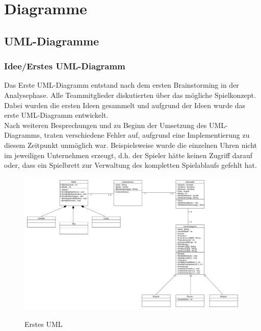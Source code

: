 \clearpage
\chapter{Diagramme}
\section{UML-Diagramme}
\subsection{Idee/Erstes UML-Diagramm}
Das Erste UML-Diagramm entstand nach dem ersten Brainstorming in der Analysephase. Alle Teammitglieder diskutierten über das mögliche Spielkonzept. Dabei wurden die ersten Ideen gesammelt und aufgrund der Ideen wurde das erste UML-Diagramm entwickelt. \\
Nach weiteren Besprechungen und zu Beginn der Umsetzung des UML-Diagramms, traten verschiedene Fehler auf, aufgrund eine Implementierung zu diesem Zeitpunkt unmöglich war. 
Beispielsweise wurde die einzelnen Uhren nicht im jeweiligen Unternehmen erzeugt, d.h. der Spieler hätte keinen Zugriff darauf oder, dass ein Spielbrett zur Verwaltung des kompletten Spielablaufs gefehlt hat.

\begin{figure} [h]
	\centering
	\includegraphics[scale=0.35, angle=90]{img/ErsterEntwurfUML.png} 
	\label{key}
	\caption{Erstes UML}
\end{figure}
\clearpage
